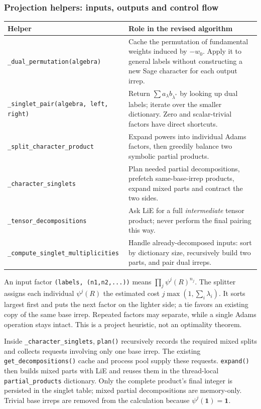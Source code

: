 \documentclass[11pt,a4paper]{article}
\numberwithin{equation}{section}
\newcommand{\code}[1]{{\small\nolinkurl{#1}}}
\begin{document}
\subsubsection{Projection helpers: inputs, outputs and control flow}
\begin{tabularx}{\textwidth}{@{}p{66mm}Y@{}}
\toprule Helper & Role in the revised algorithm\\\midrule
\code{_dual_permutation(algebra)} & Cache the permutation of fundamental weights
induced by $-w_0$. Apply it to general labels without constructing a new Sage
character for each output irrep.\\
\code{_singlet_pair(algebra, left, right)} & Return
$\sum a_\lambda b_{\lambda^*}$ by looking up dual labels; iterate over the
smaller dictionary. Zero and scalar-trivial factors have direct shortcuts.\\
\code{_split_character_product} & Expand powers into individual Adams factors,
then greedily balance two symbolic partial products.\\
\code{_character_singlets} & Plan needed partial decompositions, prefetch
same-base-irrep products, expand mixed parts and contract the two sides.\\
\code{_tensor_decompositions} & Ask LiE for a full \emph{intermediate} tensor
product; never perform the final pairing this way.\\
\code{_compute_singlet_multiplicities} & Handle already-decomposed inputs:
sort by dictionary size, recursively build two parts, and pair dual irreps.\\\bottomrule
\end{tabularx}

An input factor \code{(labels, (n1,n2,...))} means
$\prod_j\psi^j(R)^{n_j}$. The splitter assigns each individual $\psi^j(R)$ the
estimated cost $j\max(1,\sum_i\lambda_i)$. It sorts largest first and puts the
next factor on the lighter side; a tie favors an existing copy of the same base
irrep. Repeated factors may separate, while a single Adams operation stays intact.
This is a project heuristic, not an optimality theorem.

Inside \code{_character_singlets}, \code{plan()} recursively records the required
mixed splits and collects requests involving only one base irrep. The existing
\code{get_decompositions()} cache and process pool supply these requests.
\code{expand()} then builds mixed parts with LiE and reuses them in the
thread-local \code{partial_products} dictionary. Only the complete product's
final integer is persisted in the singlet table; mixed partial decompositions
are memory-only. Trivial base irreps are removed from the calculation because
$\psi^j(\mathbf1)=\mathbf1$.
\end{document}
